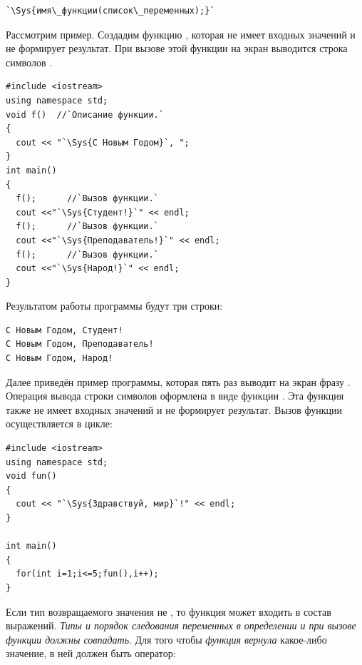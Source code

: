 \begin{lstlisting}
`\Sys{имя\_функции(список\_переменных);}`
\end{lstlisting}

Рассмотрим пример. Создадим функцию , которая не имеет входных значений и не формирует результат.
При вызове этой функции на экран выводится строка символов .

\begin{lstlisting}
#include <iostream>
using namespace std;
void f()  //`Описание функции.`
{
  cout << "`\Sys{С Новым Годом}`, ";
}
int main()
{
  f();      //`Вызов функции.`
  cout <<"`\Sys{Студент!}`" << endl;
  f();      //`Вызов функции.`
  cout <<"`\Sys{Преподаватель!}`" << endl;
  f();      //`Вызов функции.`
  cout <<"`\Sys{Народ!}`" << endl;
}
\end{lstlisting}

Результатом работы программы будут три строки:
\begin{verbatim}
С Новым Годом, Студент!
С Новым Годом, Преподаватель!
С Новым Годом, Народ!
\end{verbatim}

Далее приведён пример программы, которая пять раз выводит на экран фразу . Операция вывода строки символов оформлена в виде функции . Эта функция также
не имеет входных значений и не формирует результат. Вызов функции осуществляется в цикле:
\begin{lstlisting}
#include <iostream>
using namespace std;
void fun()
{
  cout << "`\Sys{Здравствуй, мир}`!" << endl;
}

int main()
{
  for(int i=1;i<=5;fun(),i++);
}
\end{lstlisting}

Если тип возвращаемого значения не , то функция может входить в состав выражений.
\emph{Типы и порядок следования переменных в определении и при вызове функции должны совпадать}. Для того
чтобы \emph{функция вернула} какое-либо значение, в ней должен быть
оператор: 


